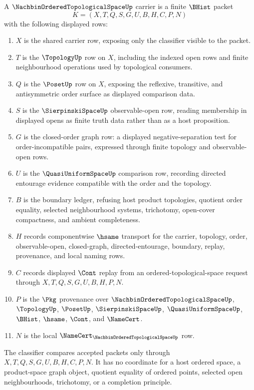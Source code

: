 \begin{definition}\label{def:nachbin-ordered-topological-space-carrier}
A $\NachbinOrderedTopologicalSpaceUp$ carrier is a finite $\BHist$ packet
$$
K=(X,T,Q,S,G,U,B,H,C,P,N)
$$
with the following displayed rows:
\begin{enumerate}
\item $X$ is the shared carrier row, exposing only the classifier visible to the packet.
\item $T$ is the $\TopologyUp$ row on $X$, including the indexed open rows and finite neighbourhood operations used by topological consumers.
\item $Q$ is the $\PosetUp$ row on $X$, exposing the reflexive, transitive, and antisymmetric order surface as displayed comparison data.
\item $S$ is the $\SierpinskiSpaceUp$ observable-open row, reading membership in displayed opens as finite truth data rather than as a host proposition.
\item $G$ is the closed-order graph row: a displayed negative-separation test for order-incompatible pairs, expressed through finite topology and observable-open rows.
\item $U$ is the $\QuasiUniformSpaceUp$ comparison row, recording directed entourage evidence compatible with the order and the topology.
\item $B$ is the boundary ledger, refusing host product topologies, quotient order equality, selected neighbourhood systems, trichotomy, open-cover compactness, and ambient completeness.
\item $H$ records componentwise $\hsame$ transport for the carrier, topology, order, observable-open, closed-graph, directed-entourage, boundary, replay, provenance, and local naming rows.
\item $C$ records displayed $\Cont$ replay from an ordered-topological-space request through $X,T,Q,S,G,U,B,H,P,N$.
\item $P$ is the $\Pkg$ provenance over $\NachbinOrderedTopologicalSpaceUp$, $\TopologyUp$, $\PosetUp$, $\SierpinskiSpaceUp$, $\QuasiUniformSpaceUp$, $\BHist$, $\hsame$, $\Cont$, and $\NameCert$.
\item $N$ is the local $\NameCert_{\NachbinOrderedTopologicalSpaceUp}$ row.
\end{enumerate}
The classifier compares accepted packets only through $X,T,Q,S,G,U,B,H,C,P,N$. It has no coordinate for a host ordered space, a product-space graph object, quotient equality of ordered points, selected open neighbourhoods, trichotomy, or a completion principle.
\end{definition}

